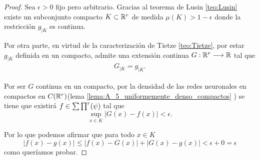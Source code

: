 
    
\begin{proof}
    Sea $\epsilon > 0$ fijo pero arbitrario.  Gracias al teorema de Lusin \ref{teo:Lusin}
    existe un subconjunto compacto $K \subset \mathbb{R}^r$ de medida
    $\mu(K) > 1 - \epsilon$ donde la restricción  $g_{|K}$ es continua. 

    Por otra parte, en virtud de la caracterización de Tietze 
    \ref{teo:Tietze}, 
    por estar $g_{|K}$ definida en un compacto, admite una 
    extensión continua $G:\mathbb{R}^r \longrightarrow \mathbb{R}$ tal que 
    \begin{equation}
        \begin{split}
            G_{|K} = g_{|K} .
        \end{split}
    \end{equation}

    Por ser $G$ continua en un compacto, por la densidad de las redes neuronales en compactos en $C(\mathbb{R}^r)$(lema \ref{lema:A_5_uniformemente_denso_compactos} ) se tiene que existirá 
     $f \in \sum \prod^r (\psi)$ tal que 
    \begin{equation}
        \sup_{x \in K} |G(x) - f(x)| < \epsilon.
    \end{equation}

    Por lo que podemos afirmar que para todo $x \in K$
    \begin{equation}
        |f(x) -g(x)| 
        \leq 
        | f(x) -G(x)| + |G(x) -g(x)|
        < \epsilon + 0 = \epsilon
    \end{equation}
    como queríamos probar.
\end{proof}


